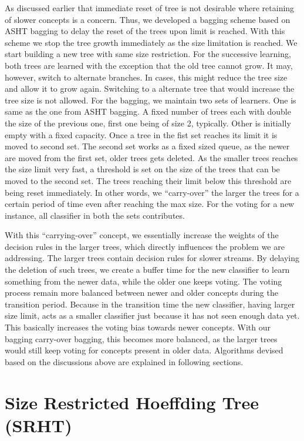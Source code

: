 As discussed earlier that immediate reset of tree is not desirable where retaining of slower concepts is a concern. Thus, we developed a bagging scheme based on ASHT bagging to delay the reset of the trees upon limit is reached. With this scheme we stop the tree growth immediately as the size limitation is reached. We start building a new tree with same size restriction. For the successive learning, both trees are learned with the exception that the old tree cannot grow. It may, however, switch to alternate branches. In cases, this might reduce the tree size and allow it to grow again. Switching to a alternate tree that would increase the tree size is not allowed. For the bagging, we maintain two sets of learners. One is same as the one from ASHT bagging. A fixed number of trees each with double the size of the previous one, first one being of size 2, typically. Other is initially empty with a fixed capacity. Once a tree in the fist set reaches its limit it is moved to second set. The second set works as a fixed sized queue, as the newer are moved from the first set, older trees gets deleted. As the smaller trees reaches the size limit very fast, a threshold is set on the size of the trees that can be moved to the second set. The trees reaching their limit below this threshold are being reset immediately. In other words, we ``carry-over'' the larger the trees for a certain period of time even after reaching the max size. For the voting for a new instance, all classifier in both the sets contributes.

With this ``carrying-over'' concept, we essentially increase the weights of the decision rules in the larger trees, which directly influences the problem we are addressing. The larger trees contain decision rules for slower streams. By delaying the deletion of such trees, we create a buffer time for the new classifier to learn something from the newer data, while the older one keeps voting. The voting process remain more balanced between newer and older concepts during the transition period. Because in the transition time the new classifier, having larger size limit, acts as a smaller classifier just because it has not seen enough data yet. This basically increases the voting bias towards newer concepts. With our bagging carry-over bagging, this becomes more balanced, as the larger trees would still keep voting for concepts present in older data. Algorithms devised based on the discussions above are explained in following sections.

\section{Size Restricted Hoeffding Tree (SRHT)}


